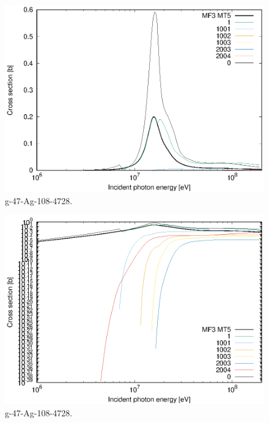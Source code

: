 \begin{figure}
 \includegraphics[width=\linewidth]{eps/g_47-Ag-108_4728.eps}
  \caption{g-47-Ag-108-4728.}
\end{figure}
\begin{figure}
 \includegraphics[width=\linewidth]{eps-log/g_47-Ag-108_4728.eps}
 \caption{g-47-Ag-108-4728.}
\end{figure}
\newpage \clearpage

